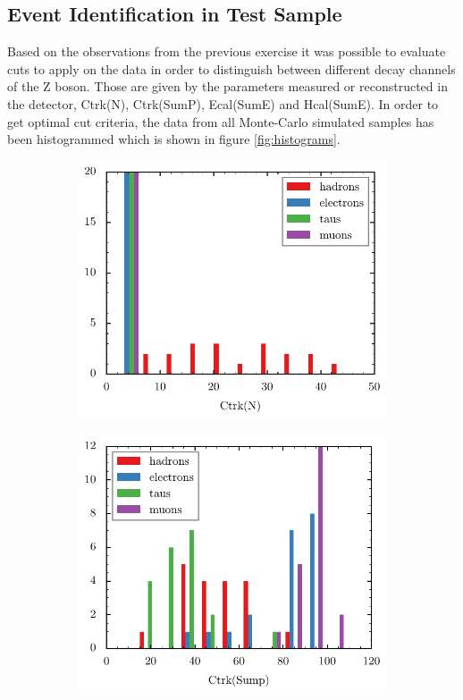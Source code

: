 \documentclass[11pt, a4paper]{article}
\numberwithin{equation}{section}
\begin{document}
\subsection{Event Identification in Test Sample}

Based on the observations from the previous exercise it was possible to evaluate cuts to apply on the data in order to distinguish between different decay channels of the Z boson.
Those are given by the parameters measured or reconstructed in the detector, Ctrk(N), Ctrk(SumP), Ecal(SumE) and Hcal(SumE).
In order to get optimal cut criteria, the data from all Monte-Carlo simulated samples has been histogrammed which is shown in figure \ref{fig:histograms}.
\begin{figure}[htb]
	\begin{subfigure}{.5\textwidth}
		\centering
		\includegraphics[width=\textwidth]{./figures/event_display/Ctrk(N)}

	\end{subfigure}
	\begin{subfigure}{.5\textwidth}
		\centering
		\includegraphics[width=\textwidth]{./figures/event_display/Ctrk(SumP)}


\end{subfigure}
\end{figure}
\end{document}
